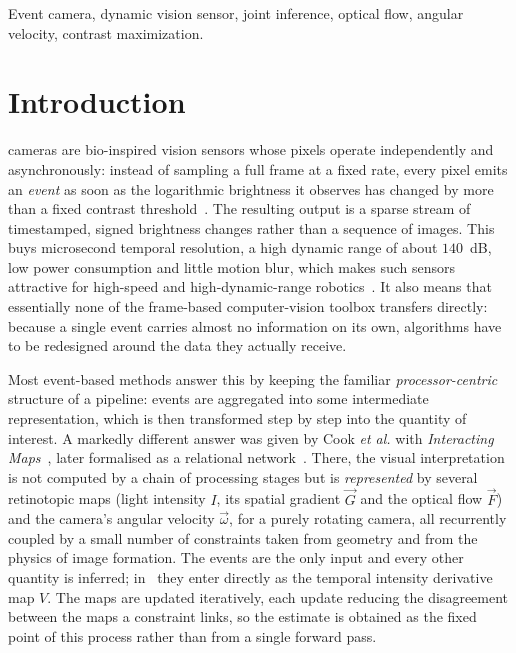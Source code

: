 \documentclass[journal]{IEEEtran}
\newcommand{\Imap}{I}
\newcommand{\Vmap}{V}
\newcommand{\Gmap}{\vec{G}}
\newcommand{\Fmap}{\vec{F}}
\newcommand{\wvec}{\vec{\omega}}
\begin{document}
\begin{IEEEkeywords}
Event camera, dynamic vision sensor, joint inference, optical flow, angular velocity, contrast maximization.
\end{IEEEkeywords}

\IEEEpeerreviewmaketitle


\section{Introduction}

 cameras are bio-inspired vision sensors whose pixels operate independently and asynchronously: instead of sampling a full frame at a fixed rate, every pixel emits an \emph{event} as soon as the logarithmic brightness it observes has changed by more than a fixed contrast threshold~\cite{lichtsteiner2008}. The resulting output is a sparse stream of timestamped, signed brightness changes rather than a sequence of images. This buys microsecond temporal resolution, a high dynamic range of about $140$~dB, low power consumption and little motion blur, which makes such sensors attractive for high-speed and high-dynamic-range robotics~\cite{gallego2022survey}. It also means that essentially none of the frame-based computer-vision toolbox transfers directly: because a single event carries almost no information on its own, algorithms have to be redesigned around the data they actually receive.

Most event-based methods answer this by keeping the familiar \emph{processor-centric} structure of a pipeline: events are aggregated into some intermediate representation, which is then transformed step by step into the quantity of interest. A markedly different answer was given by Cook \emph{et al.} with \emph{Interacting Maps}~\cite{cook2011}, later formalised as a relational network~\cite{martel2015relational}. There, the visual interpretation is not computed by a chain of processing stages but is \emph{represented} by several retinotopic maps (light intensity $\Imap$, its spatial gradient $\Gmap$ and the optical flow $\Fmap$) and the camera's angular velocity $\wvec$, for a purely rotating camera, all recurrently coupled by a small number of constraints taken from geometry and from the physics of image formation. The events are the only input and every other quantity is inferred; in~\cite{cook2011} they enter directly as the temporal intensity derivative map $\Vmap$. The maps are updated iteratively, each update reducing the disagreement between the maps a constraint links, so the estimate is obtained as the fixed point of this process rather than from a single forward pass. 
\end{document}
